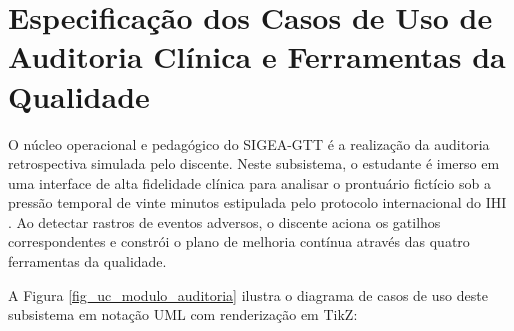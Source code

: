 \chapter{Especificação dos Casos de Uso de Auditoria Clínica e Ferramentas da Qualidade}
\label{cap_auditoria_gtt}

O núcleo operacional e pedagógico do SIGEA-GTT é a realização da auditoria retrospectiva simulada pelo discente. Neste subsistema, o estudante é imerso em uma interface de alta fidelidade clínica para analisar o prontuário fictício sob a pressão temporal de vinte minutos estipulada pelo protocolo internacional do IHI \cite{ihi2009}. Ao detectar rastros de eventos adversos, o discente aciona os gatilhos correspondentes e constrói o plano de melhoria contínua através das quatro ferramentas da qualidade.

A Figura \ref{fig_uc_modulo_auditoria} ilustra o diagrama de casos de uso deste subsistema em notação UML com renderização em TikZ:

